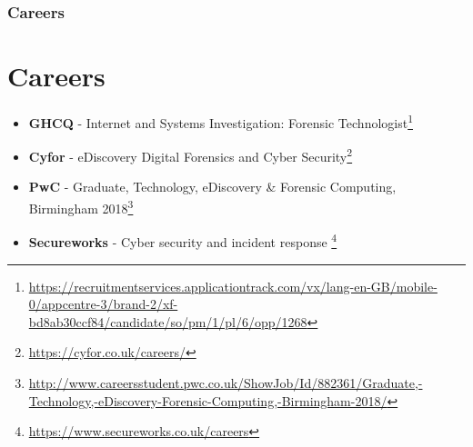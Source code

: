 \documentclass{beamer}
\begin{document}
\begin{frame}
	\frametitle{Careers}
	\section{Careers}
	\begin{itemize}
		\item \textbf{GHCQ} - Internet and Systems Investigation: Forensic Technologist\footnote{\tiny\url{https://recruitmentservices.applicationtrack.com/vx/lang-en-GB/mobile-0/appcentre-3/brand-2/xf-bd8ab30ccf84/candidate/so/pm/1/pl/6/opp/1268}}
		\item \textbf{Cyfor} - eDiscovery Digital Forensics and Cyber Security\footnote{\tiny\url{https://cyfor.co.uk/careers/}}
		\item \textbf{PwC} - Graduate, Technology, eDiscovery {\&} Forensic Computing, Birmingham 2018\footnote{\tiny\url{http://www.careersstudent.pwc.co.uk/ShowJob/Id/882361/Graduate,-Technology,-eDiscovery-Forensic-Computing,-Birmingham-2018/}}
		\item \textbf{Secureworks} - Cyber security and incident response \footnote{\tiny\url{https://www.secureworks.co.uk/careers}}
	\end{itemize}
\end{frame}
\end{document}
